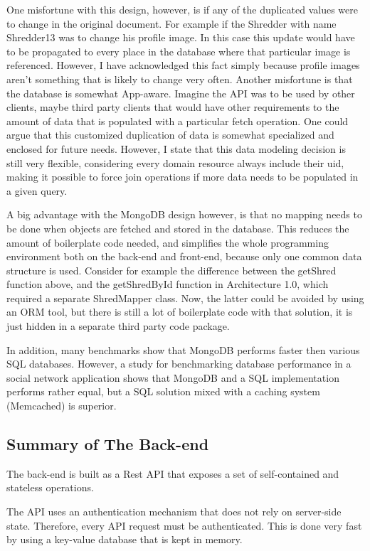 One misfortune with this design, however, is if any of the duplicated values were to change in the original document. For example if the Shredder with name Shredder13 was to change his profile image. In this case this update would have to be propagated to every place in the database where that particular image is referenced. However, I have acknowledged this fact simply because profile images aren't something that is likely to change very often. Another misfortune is that the database is somewhat App-aware. Imagine the API was to be used by other clients, maybe third party clients that would have other requirements to the amount of data that is populated with a particular fetch operation. One could argue that this customized duplication of data is somewhat specialized and enclosed for future needs. However, I state that this data modeling decision is still very flexible, considering every domain resource always include their uid, making it possible to force join operations if more data needs to be  populated in a given query. 

A big advantage with the MongoDB design however, is that no mapping needs to be done when objects are fetched and stored in the database. This reduces the amount of boilerplate code needed, and simplifies the whole programming environment both on the back-end and front-end, because only one common data structure is used. Consider for example the difference between the getShred function above, and the getShredById function in Architecture 1.0, which required a separate ShredMapper class. Now, the latter could be avoided by using an ORM tool, but there is still a lot of boilerplate code with that solution, it is just hidden in a separate third party code package.

In addition, many benchmarks\cite{mongosql}\cite{mongosql2}\cite{mongosql4}\cite{mongosql5} show that MongoDB performs faster then various SQL databases. However, a study for benchmarking database performance in a social network application shows that MongoDB and a SQL implementation performs rather equal, but a SQL solution mixed with a caching system (Memcached\cite{memcached}) is superior\cite{mongsql3}.

\subsection{Summary of The Back-end}
The back-end is built as a Rest API that exposes a set of self-contained and stateless operations.

The API uses an authentication mechanism that does not rely on server-side state. Therefore, every API request must be authenticated. This is done very fast by using a key-value database that is kept in memory. 

